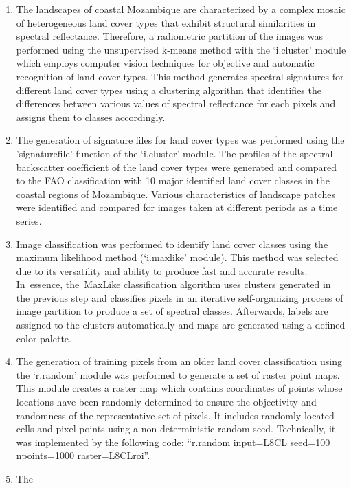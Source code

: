 \documentclass[coasts,article,accept,pdftex,oneauthor]{Definitions/mdpi}
\begin{document}
\begin{enumerate}
  \item {The landscapes of coastal Mozambique are characterized by a complex mosaic of heterogeneous land cover types that{ }exhibit structural similarities in spectral reflectance. Therefore, a }radiometric {partition of the images was performed} using the unsupervised k-means method {with the }`i.cluster' module {which employs computer vision techniques for objective and automatic recognition of land cover types. This method generates spectral signatures for different land cover types using a clustering algorithm that identifies the differences between various values of spectral reflectance for each pixels and assigns {them} to classes accordingly.}
    \item The generation of signature files for land cover types {was performed }using {the }'signaturefile' function of the `i.cluster' module. {The profiles of the }spectral backscatter coefficient{ }of the land cover types were generated and compared to {the }FAO classification with 10 major {identified} land cover classes{{ }in {the }coastal regions of Mozambique}. {Various} characteristics of landscape patches were identified and compared for{ }images taken at different {periods as a time series}{.}
  \item Image classification {{was performed to identify }land cover classes }using the maximum likelihood method (`i.maxlike' module). {This method was selected due to its versatility and ability to produce fast and accurate results. In~essence, the~MaxLike classification algorithm uses clusters generated in the previous step and classifies pixels{ }in an iterative self-organizing process of image partition to produce a set of spectral classes. {Afterwards,}  labels {are assigned }to the clusters automatically and{ }maps {are generated }using a defined color palette}.
  \item The generation of training pixels from an older land cover classification using the `r.random' module {was performed to generate }a set of raster point maps. {This module creates a raster map which contains coordinates of points whose locations have been randomly determined to ensure {the }objectivity and randomness of the representative set of pixels.{ }It } includes randomly located cells and pixel points using {a} non-deterministic random seed. {Technically, it was implemented by the following code: ``r.random input=L8CL seed=100 npoints=1000 raster=L8CLroi''.}
  \item The 

\end{enumerate}
\end{document}

